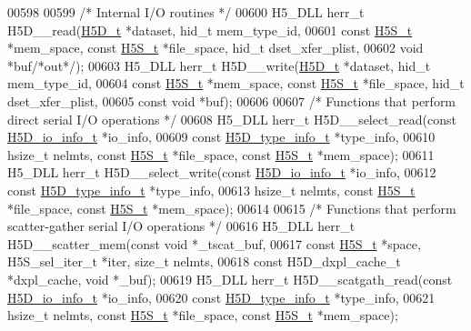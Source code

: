 \begin{DoxyCode}
00598 
00599 \textcolor{comment}{/* Internal I/O routines */}
00600 H5\_DLL herr\_t H5D\_\_read(\hyperlink{struct_h5_d__t}{H5D\_t} *dataset, hid\_t mem\_type\_id,
00601     \textcolor{keyword}{const} \hyperlink{struct_h5_s__t}{H5S\_t} *mem\_space, \textcolor{keyword}{const} \hyperlink{struct_h5_s__t}{H5S\_t} *file\_space, hid\_t dset\_xfer\_plist,
00602     \textcolor{keywordtype}{void} *buf\textcolor{comment}{/*out*/});
00603 H5\_DLL herr\_t H5D\_\_write(\hyperlink{struct_h5_d__t}{H5D\_t} *dataset, hid\_t mem\_type\_id,
00604     \textcolor{keyword}{const} \hyperlink{struct_h5_s__t}{H5S\_t} *mem\_space, \textcolor{keyword}{const} \hyperlink{struct_h5_s__t}{H5S\_t} *file\_space, hid\_t dset\_xfer\_plist,
00605     \textcolor{keyword}{const} \textcolor{keywordtype}{void} *buf);
00606 
00607 \textcolor{comment}{/* Functions that perform direct serial I/O operations */}
00608 H5\_DLL herr\_t H5D\_\_select\_read(\textcolor{keyword}{const} \hyperlink{struct_h5_d__io__info__t}{H5D\_io\_info\_t} *io\_info,
00609     \textcolor{keyword}{const} \hyperlink{struct_h5_d__type__info__t}{H5D\_type\_info\_t} *type\_info,
00610     hsize\_t nelmts, \textcolor{keyword}{const} \hyperlink{struct_h5_s__t}{H5S\_t} *file\_space, \textcolor{keyword}{const} \hyperlink{struct_h5_s__t}{H5S\_t} *mem\_space);
00611 H5\_DLL herr\_t H5D\_\_select\_write(\textcolor{keyword}{const} \hyperlink{struct_h5_d__io__info__t}{H5D\_io\_info\_t} *io\_info,
00612     \textcolor{keyword}{const} \hyperlink{struct_h5_d__type__info__t}{H5D\_type\_info\_t} *type\_info,
00613     hsize\_t nelmts, \textcolor{keyword}{const} \hyperlink{struct_h5_s__t}{H5S\_t} *file\_space, \textcolor{keyword}{const} \hyperlink{struct_h5_s__t}{H5S\_t} *mem\_space);
00614 
00615 \textcolor{comment}{/* Functions that perform scatter-gather serial I/O operations */}
00616 H5\_DLL herr\_t H5D\_\_scatter\_mem(\textcolor{keyword}{const} \textcolor{keywordtype}{void} *\_tscat\_buf,
00617     \textcolor{keyword}{const} \hyperlink{struct_h5_s__t}{H5S\_t} *space, H5S\_sel\_iter\_t *iter, \textcolor{keywordtype}{size\_t} nelmts,
00618     \textcolor{keyword}{const} H5D\_dxpl\_cache\_t *dxpl\_cache, \textcolor{keywordtype}{void} *\_buf);
00619 H5\_DLL herr\_t H5D\_\_scatgath\_read(\textcolor{keyword}{const} \hyperlink{struct_h5_d__io__info__t}{H5D\_io\_info\_t} *io\_info,
00620     \textcolor{keyword}{const} \hyperlink{struct_h5_d__type__info__t}{H5D\_type\_info\_t} *type\_info,
00621     hsize\_t nelmts, \textcolor{keyword}{const} \hyperlink{struct_h5_s__t}{H5S\_t} *file\_space, \textcolor{keyword}{const} \hyperlink{struct_h5_s__t}{H5S\_t} *mem\_space);

\end{DoxyCode}
